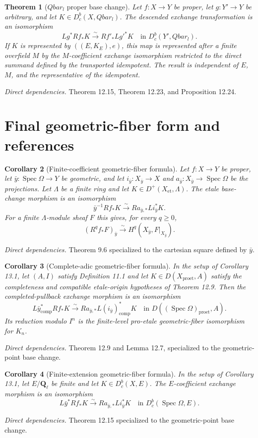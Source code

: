 \documentclass[10pt]{article}
\newtheorem{theorem}{Theorem}[section]
\newtheorem{corollary}[theorem]{Corollary}
\theoremstyle{definition}
\newcommand{\Spec}{\operatorname{Spec}}
\newcommand{\Ql}{\mathbf Q_\ell}
\newcommand{\Qlb}{\overline{\mathbf Q}_\ell}
\newcommand{\Dbc}{D^b_c}
\newcommand{\Dplus}{D^+}
\newcommand{\Et}{\mathrm{et}}
\newcommand{\Proet}{\mathrm{proet}}
\newcommand{\deps}[1]{\par\smallskip\textit{Direct dependencies.} #1\par}
\def\Qlb{Qbar_l}%
\begin{document}
\begin{theorem}[$\Qlb$ proper base change]
Let $f:X\to Y$ be proper, let $g:Y'\to Y$ be arbitrary, and let
$K\in\Dbc(X,\Qlb)$.  The descended exchange transformation is an
isomorphism
\[
 Lg^*Rf_*K\xrightarrow{\sim}Rf'_*Lg'^*K
 \quad\text{in }\Dbc(Y',\Qlb).
\]
If $K$ is represented by $((E,K_E),e)$, this map is represented after a
finite overfield $M$ by the $M$-coefficient exchange isomorphism restricted
to the direct summand defined by the transported idempotent.  The result is
independent of $E$, $M$, and the representative of the idempotent.
\end{theorem}
\deps{Theorem 12.15, Theorem 12.23, and Proposition 12.24.}

\section{Final geometric-fiber form and references}

\begin{corollary}[Finite-coefficient geometric-fiber formula]
Let $f:X\to Y$ be proper, let $\bar y:\Spec\Omega\to Y$ be geometric,
and let $i_{\bar y}:X_{\bar y}\to X$ and
$a_{\bar y}:X_{\bar y}\to\Spec\Omega$ be the projections.  Let $\Lambda$
be a finite ring and let $K\in\Dplus(X_{\Et},\Lambda)$.  The etale
base-change morphism is an isomorphism
\[
 \bar y^{-1}Rf_*K\xrightarrow{\sim}
 Ra_{\bar y,*}Li_{\bar y}^*K.
\]
For a finite $\Lambda$-module sheaf $F$ this gives, for every $q\geq0$,
\[
 (R^qf_*F)_{\bar y}\xrightarrow{\sim}
 H^q(X_{\bar y},F|_{X_{\bar y}}).
\]
\end{corollary}
\deps{Theorem 9.6 specialized to the cartesian square defined by
$\bar y$.}

\begin{corollary}[Complete-adic geometric-fiber formula]
In the setup of Corollary 13.1, let $(A,I)$ satisfy Definition 11.1 and let
$K\in D(X_{\Proet},A)$ satisfy the completeness and compatible
etale-origin hypotheses of Theorem 12.9.  Then the completed-pullback
exchange morphism is an isomorphism
\[
 L\bar y^*_{\mathrm{comp}}Rf_*K
 \xrightarrow{\sim}
 Ra_{\bar y,*}L(i_{\bar y})^*_{\mathrm{comp}}K
 \quad\text{in }D((\Spec\Omega)_{\Proet},A).
\]
Its reduction modulo $I^n$ is the finite-level pro-etale geometric-fiber
isomorphism for $K_n$.
\end{corollary}
\deps{Theorem 12.9 and Lemma 12.7, specialized to the geometric-point
base change.}

\begin{corollary}[Finite-extension geometric-fiber formula]
In the setup of Corollary 13.1, let $E/\Ql$ be finite and let
$K\in\Dbc(X,E)$.  The $E$-coefficient exchange morphism is an isomorphism
\[
 L\bar y^*Rf_*K\xrightarrow{\sim}
 Ra_{\bar y,*}Li_{\bar y}^*K
 \quad\text{in }\Dbc(\Spec\Omega,E).
\]
\end{corollary}
\deps{Theorem 12.15 specialized to the geometric-point base change.}
\end{document}
